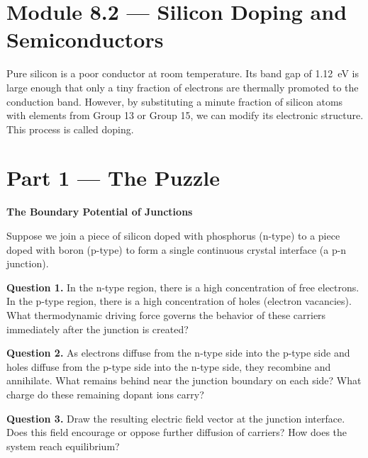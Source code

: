 \documentclass[12pt, a4paper]{book}
\begin{document}
\setcounter{chapter}{7}
\setcounter{section}{1}

\section{Module 8.2 --- Silicon Doping and Semiconductors}

Pure silicon is a poor conductor at room temperature. Its band gap of \SI{1.12}{eV} is large enough that only a tiny fraction of electrons are thermally promoted to the conduction band. However, by substituting a minute fraction of silicon atoms with elements from Group 13 or Group 15, we can modify its electronic structure. This process is called doping.

\newpage

\section{Part 1 --- The Puzzle}

\begin{puzzlebox}
\textbf{The Boundary Potential of Junctions}

Suppose we join a piece of silicon doped with phosphorus (n-type) to a piece doped with boron (p-type) to form a single continuous crystal interface (a p-n junction).

\medskip
\begin{center}
\end{center}

\medskip
\textbf{Question 1.} In the n-type region, there is a high concentration of free electrons. In the p-type region, there is a high concentration of holes (electron vacancies). What thermodynamic driving force governs the behavior of these carriers immediately after the junction is created?

\textbf{Question 2.} As electrons diffuse from the n-type side into the p-type side and holes diffuse from the p-type side into the n-type side, they recombine and annihilate. What remains behind near the junction boundary on each side? What charge do these remaining dopant ions carry?

\textbf{Question 3.} Draw the resulting electric field vector at the junction interface. Does this field encourage or oppose further diffusion of carriers? How does the system reach equilibrium?
\end{puzzlebox}
\end{document}
